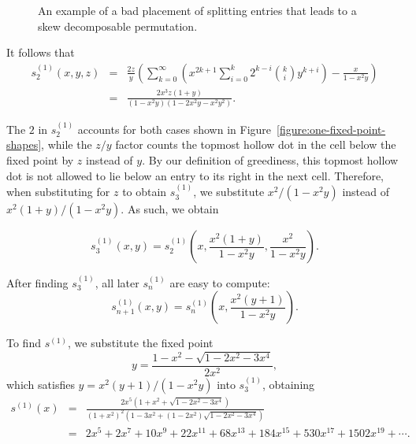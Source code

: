 \documentclass[10pt]{article}
\theoremstyle{plain}
\begin{document}
\begin{figure}
\centering
  \caption{An example of a bad placement of splitting entries that leads to a skew decomposable permutation.}
  \label{figure:bad-case}
\end{figure}

It follows that
	\begin{eqnarray*}
	s_2^{(1)}(x,y,z)
	&=&
	\frac{2z}{y}\left(\sum_{k=0}^\infty \left(x^{2k+1}\sum_{i=0}^k 2^{k-i}{k\choose i}y^{k+i}\right) - \frac{x}{1-x^2y}\right)\\
	&=&
	\frac{2x^3z(1+y)}{(1-x^2y)(1-2x^2y-x^2y^2)}.
	\end{eqnarray*}

The $2$ in $s_2^{(1)}$ accounts for both cases shown in Figure~\ref{figure:one-fixed-point-shapes}, while the $z/y$ factor counts the topmost hollow dot in the cell below the fixed point by $z$ instead of $y$. By our definition of greediness, this topmost hollow dot is not allowed to lie below an entry to its right in the next cell. Therefore, when substituting for $z$ to obtain $s_3^{(1)}$, we substitute $x^2/(1-x^2y)$ instead of $x^2(1+y)/(1-x^2y)$. As such, we obtain

	\[
	s_3^{(1)}(x,y)=s_2^{(1)}\left(x, \frac{x^2(1+y)}{1-x^2y}, \frac{x^2}{1-x^2y}\right).
	\]

After finding $s_3^{(1)}$, all later $s_n^{(1)}$ are easy to compute:
	\[
	s_{n+1}^{(1)}(x,y)=s_n^{(1)}\left(x,\frac{x^2(y+1)}{1-x^2y}\right).
	\]
	
To find $s^{(1)}$, we substitute the fixed point
	\[
	y=\frac{1-x^2-\sqrt{1-2x^2-3x^4}}{2x^2},
	\]
which satisfies $y=x^2(y+1)/(1-x^2y)$ into $s_3^{(1)}$, obtaining
	\begin{eqnarray*}
	s^{(1)}(x) &=& \frac{2x^5(1+x^2+\sqrt{1 - 2x^2 - 3x^4})}{
	        (1+x^2)^2 \left( 1 -3x^2 + (1-2x^2) \sqrt{1 - 2x^2 - 3x^4}\right)} \\
	  &=& 2x^5 + 2x^7 + 10x^9 + 22x^{11} + 68x^{13} + 184x^{15} + 530x^{17} +
	        1502x^{19} + \cdots .
	\end{eqnarray*}
\end{document}
